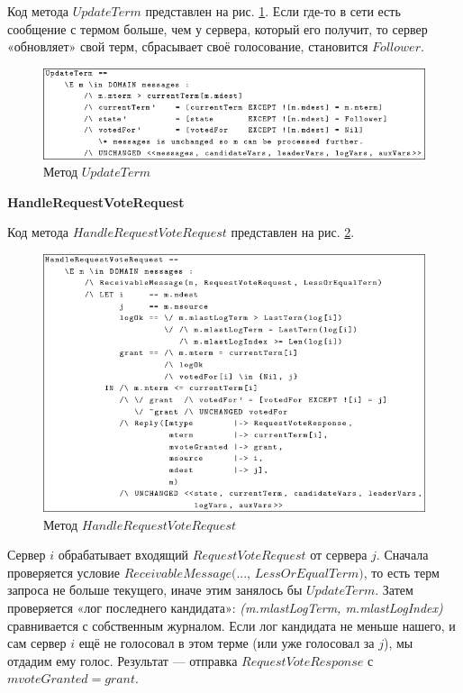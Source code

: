 Код метода $UpdateTerm$ представлен на рис. \ref{fig:tla-06-update-term}.
Если где-то в сети есть сообщение с термом больше, чем у сервера, который
его получит, то сервер «обновляет» свой терм, сбрасывает своё голосование,
становится $Follower$.

\begin{figure}
  \centering
  \includegraphics[scale=0.4]{inc/tla-06-update-term.png}
  \caption{Метод $UpdateTerm$}
  \label{fig:tla-06-update-term}
\end{figure}

\textbf{HandleRequestVoteRequest}

Код метода $HandleRequestVoteRequest$ представлен на рис. \ref{fig:tla-06-handle-request-vote}.

\begin{figure}
  \centering
  \includegraphics[scale=0.4]{inc/tla-06-handle-request-vote.png}
  \caption{Метод $HandleRequestVoteRequest$}
  \label{fig:tla-06-handle-request-vote}
\end{figure}

Сервер $i$ обрабатывает входящий $RequestVoteRequest$ от сервера $j$. Сначала
проверяется условие $\textit{ReceivableMessage(..., LessOrEqualTerm)}$, то есть
терм запроса не больше текущего, иначе этим занялось бы $UpdateTerm$. Затем
проверяется «лог последнего кандидата»: \textit{(m.mlastLogTerm, m.mlastLogIndex)}
сравнивается с собственным журналом. Если лог кандидата не меньше нашего, и сам
сервер $i$ ещё не голосовал в этом терме (или уже голосовал за $j$), мы отдадим
ему голос. Результат — отправка $RequestVoteResponse$ с $mvoteGranted = grant$.

